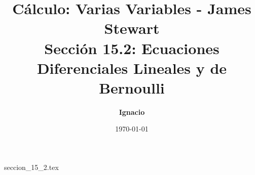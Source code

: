 \documentclass[11pt,spanish,oneside]{report}
\title{\textbf{Cálculo: Varias Variables - James Stewart} \\ \Large Sección 15.2: Ecuaciones Diferenciales Lineales y de Bernoulli}
\author{\textbf{Ignacio}}
\date{\today}
\begin{document}
\maketitle

{seccion_15_2.tex}
\end{document}

